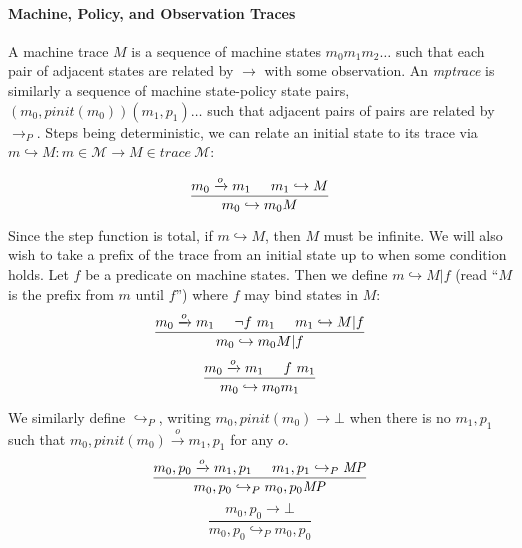 \documentclass[conference]{IEEEtran}
\newcommand{\MP}{\mathit{MP}}
\begin{document}
  \paragraph{Machine, Policy, and Observation Traces}

    A machine trace \(M\) is a sequence of machine states \(m_0 m_1 m_2 \dots\) such that each
    pair of adjacent states are related by \(\longrightarrow\) with some observation. An
    {\it mptrace} is similarly a sequence of machine state-policy state pairs,
    \((m_0,\mathit{pinit}(m_0))(m_1,p_1) \dots\) 
    such that adjacent pairs of pairs are related
    by \(\longrightarrow_P\). Steps being deterministic, we can relate an initial state to its trace
    via \(m \hookrightarrow M : m \in \mathcal{M} \rightarrow M \in \mathit{trace}\ \mathcal{M}\):

    \[\frac{m_0 \xrightarrow{o} m_1 \hspace{.5cm} m_1 \hookrightarrow M}
           {m_0 \hookrightarrow m_0 M}\]


    Since the step function is total, if \(m \hookrightarrow M\), then \(M\) must be infinite.
    We will also wish to take a prefix of the trace from an initial state up to when some condition
    holds.
    Let \(f\) be a predicate on machine states. Then we define \(m \hookrightarrow M | f\)
    (read ``\(M\) is the prefix from \(m\) until \(f\)'') where \(f\) may bind states in \(M\):
    \[\frac{m_0 \xrightarrow{o} m_1 \hspace{.5cm} \neg f\ m_1 \hspace{.5cm} m_1 \hookrightarrow M | f }
           {m_0 \hookrightarrow m_0 M | f}\]
    \[\frac{m_0 \xrightarrow{o} m_1 \hspace{.5cm} f\ m_1}
           {m_0 \hookrightarrow m_0 m_1}\]


    We similarly define \(\hookrightarrow_P\), writing \(m_0,\mathit{pinit}(m_0) \longrightarrow \bot\) when
    there is no \(m_1,p_1\) such that \(m_0,\mathit{pinit}(m_0) \xrightarrow{o} m_1,p_1\) for any \(o\).
    \[\frac{m_0,p_0 \xrightarrow{o} m_1,p_1 \hspace{.5cm} m_1,p_1 \hookrightarrow_P \MP}
           {m_0,p_0 \hookrightarrow_P m_0,p_0 \MP}\]
    \[\frac{m_0,p_0 \longrightarrow \bot}
           {m_0,p_0 \hookrightarrow_P m_0,p_0}\]
\end{document}
